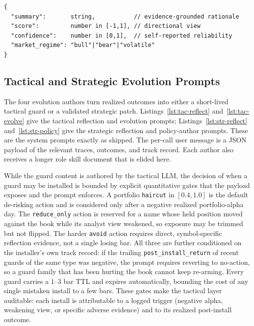 \documentclass[letterpaper]{article}
\begin{document}
\begin{listing}[tb]
\caption{Shared analyst output schema. All four analysts and the regime classifier
return this object, and malformed output falls back to a deterministic trend rule.}
\label{lst:analyst-schema}
\begin{lstlisting}
{
  "summary":       string,           // evidence-grounded rationale
  "score":         number in [-1,1], // directional view
  "confidence":    number in [0,1],  // self-reported reliability
  "market_regime": "bull"|"bear"|"volatile"
}
\end{lstlisting}
\end{listing}

\subsection{Tactical and Strategic Evolution Prompts}
\label{app:control-prompts}

The four evolution authors turn realized outcomes into either a short-lived
tactical guard or a validated strategic patch. Listings~\ref{lst:tac-reflect}
and~\ref{lst:tac-evolve} give the tactical reflection and evolution prompts;
Listings~\ref{lst:str-reflect} and~\ref{lst:str-policy} give the strategic
reflection and policy-author prompts. These are the system prompts exactly as
shipped. The per-call user message is a JSON payload of the relevant traces,
outcomes, and track record. Each author also receives a longer role skill document
that is elided here.

While the guard content is authored by the tactical LLM, the decision of
when a guard may be installed is bounded by explicit quantitative gates that
the payload exposes and the prompt enforces. A portfolio \texttt{haircut} in
$[0.4,1.0]$ is the default de-risking action and is considered only after a negative
realized portfolio-alpha day. The \texttt{reduce\_only} action is reserved for a name whose held
position moved against the book while its analyst view weakened, so exposure may be
trimmed but not flipped. The harder \texttt{avoid} action requires direct,
symbol-specific reflection evidence, not a single losing bar. All three are
further conditioned on the installer's own track record: if the trailing
\texttt{post\_install\_return} of recent guards of the same type was negative, the
prompt requires reverting to no-action, so a guard family that has been hurting the
book cannot keep re-arming. Every guard carries a $1$--$3$ bar TTL and expires
automatically, bounding the cost of any single mistaken install to a few bars. These
gates make the tactical layer auditable: each install is attributable to a logged
trigger (negative alpha, weakening view, or specific adverse evidence) and to its
realized post-install outcome.
\end{document}

